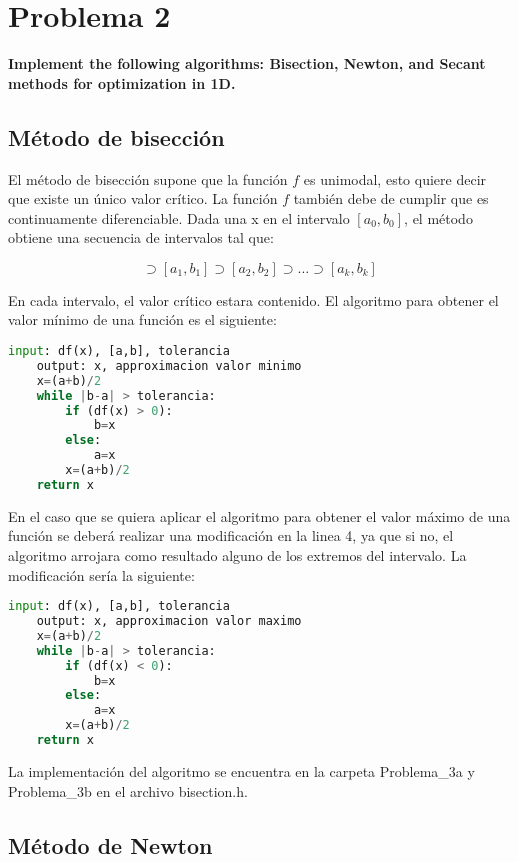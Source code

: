 \section*{Problema 2}
\textbf{Implement the following algorithms: Bisection, Newton, and Secant methods for optimization in 1D.}

\subsection*{Método de bisección}

El método de bisección supone que la función $f$ es unimodal, esto quiere decir que existe un único valor crítico. La función $f$ también debe de cumplir que es continuamente diferenciable. Dada una x en el intervalo $[a_0,b_0]$, el método obtiene una secuencia de intervalos tal que:

\begin{equation*}
    [a_0,b_0]\supset [a_1,b_1]\supset [a_2,b_2] \supset \dots \supset [a_k,b_k]
\end{equation*}

En cada intervalo, el valor crítico estara contenido. El algoritmo para obtener el valor mínimo de una función es el siguiente:
\begin{lstlisting}[language=python]
    input: df(x), [a,b], tolerancia
    output: x, approximacion valor minimo
    x=(a+b)/2
    while |b-a| > tolerancia:
        if (df(x) > 0):
            b=x
        else:
            a=x
        x=(a+b)/2
    return x
\end{lstlisting}

En el caso que se quiera aplicar el algoritmo para obtener el valor máximo de una función se deberá realizar una modificación en la linea 4, ya que si no, el algoritmo arrojara como resultado alguno de los extremos del intervalo. La modificación sería la siguiente:

\begin{lstlisting}[language=python]
    input: df(x), [a,b], tolerancia
    output: x, approximacion valor maximo
    x=(a+b)/2
    while |b-a| > tolerancia:
        if (df(x) < 0):
            b=x
        else:
            a=x
        x=(a+b)/2
    return x
\end{lstlisting}

La implementación del algoritmo se encuentra en la carpeta \textcolor{title}{Problema\_3a} y \textcolor{title}{Problema\_3b} en el archivo \textcolor{citecolor}{bisection.h}.

\subsection*{Método de Newton}

